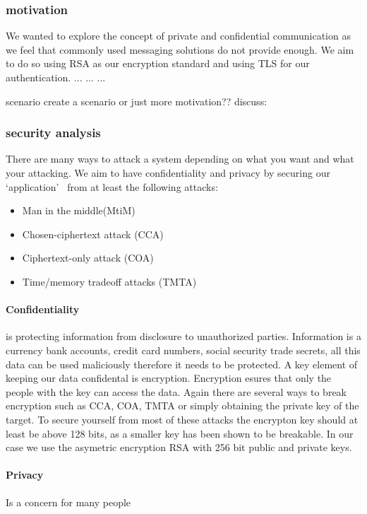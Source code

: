 
\subsubsection{motivation}
We wanted to explore the concept of private and
confidential communication as we feel that commonly used messaging
solutions do not provide enough. We aim to do so using RSA as our
encryption standard and using TLS for our authentication.
...
...
...


scenario
create a scenario or just more motivation??
discuss:

\subsubsection{security analysis}
There are many ways to attack a system depending on what you want and
what your attacking. We aim to have confidentiality and privacy by
securing our `application'~ from at least the
following attacks:
\begin{itemize}
\item Man in the middle(MtiM)
\item Chosen-ciphertext attack (CCA)
\item Ciphertext-only attack (COA)
\item Time/memory tradeoff attacks (TMTA)
\end{itemize}

\paragraph{Confidentiality} is protecting information from disclosure
to unauthorized parties. Information is a currency bank accounts,
credit card numbers, social security trade secrets, all this data can
be used maliciously therefore it needs to be protected. A key element
of keeping our data confidental is encryption. Encryption esures that
only the people with the key can access the data. Again there are
several ways to break encryption such as CCA, COA, TMTA or simply
obtaining the private key of the target. To secure yourself from most
of these attacks the encrypton key should at least be above 128 bits,
as a smaller key has been shown to be breakable. In our case we use
the asymetric encryption RSA with 256 bit public and private keys.

\paragraph{Privacy} Is a concern for many people
